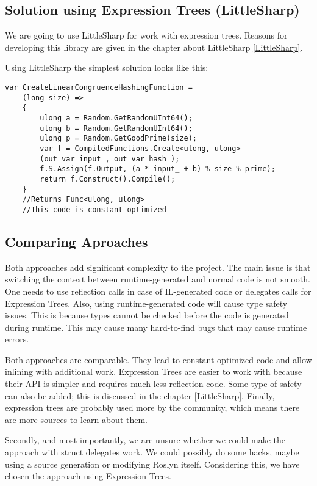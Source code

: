 \subsection{Solution using Expression Trees (LittleSharp)}
We are going to use LittleSharp for work with expression trees. Reasons for developing this library are given in the chapter about LittleSharp \ref{LittleSharp}.

Using LittleSharp the simplest solution looks like this:
\begin{lstlisting}
var CreateLinearCongruenceHashingFunction = 
    (long size) =>
    {
        ulong a = Random.GetRandomUInt64();
        ulong b = Random.GetRandomUInt64();
        ulong p = Random.GetGoodPrime(size);
        var f = CompiledFunctions.Create<ulong, ulong>
        (out var input_, out var hash_);
        f.S.Assign(f.Output, (a * input_ + b) % size % prime);
        return f.Construct().Compile();
    }
    //Returns Func<ulong, ulong>
    //This code is constant optimized
\end{lstlisting}

\subsection{Comparing Aproaches}
Both approaches add significant complexity to the project. The main issue is that switching the context between runtime-generated and normal code is not smooth. One needs to use reflection calls in case of IL-generated code or delegates calls for Expression Trees. 
Also, using runtime-generated code will cause type safety issues. This is because types cannot be checked before the code is generated during runtime. This may cause many hard-to-find bugs that may cause runtime errors.

Both approaches are comparable. They lead to constant optimized code and allow inlining with additional work. Expression Trees are easier to work with because their API is simpler and requires much less reflection code. Some type of safety can also be added; this is discussed in the chapter \ref{LittleSharp}. Finally, expression trees are probably used more by the community, which means there are more sources to learn about them.

Secondly, and most importantly, we are unsure whether we could make the approach with struct delegates work. We could possibly do some hacks, maybe using a source generation or modifying Roslyn itself. Considering this, we have chosen the approach using Expression Trees. 

